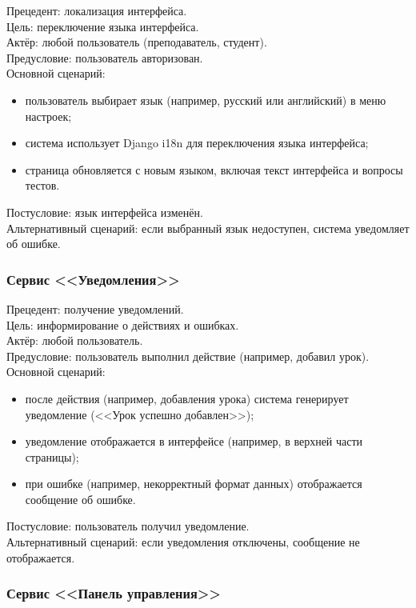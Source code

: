 {Прецедент: локализация интерфейса}. \\
{Цель}: переключение языка интерфейса. \\
{Актёр}: любой пользователь (преподаватель, студент). \\
{Предусловие}: пользователь авторизован. \\
{Основной сценарий}:
\begin{itemize}
	\item пользователь выбирает язык (например, русский или английский) в меню настроек;
	\item система использует Django i18n для переключения языка интерфейса;
	\item страница обновляется с новым языком, включая текст интерфейса и вопросы тестов.
\end{itemize}
{Постусловие}: язык интерфейса изменён. \\
{Альтернативный сценарий}: если выбранный язык недоступен, система уведомляет об ошибке.

\subsubsection{Сервис <<Уведомления>>}

{Прецедент: получение уведомлений}. \\
{Цель}: информирование о действиях и ошибках. \\
{Актёр}: любой пользователь. \\
{Предусловие}: пользователь выполнил действие (например, добавил урок). \\
{Основной сценарий}:
\begin{itemize}
	\item после действия (например, добавления урока) система генерирует уведомление (<<Урок успешно добавлен>>);
	\item уведомление отображается в интерфейсе (например, в верхней части страницы);
	\item при ошибке (например, некорректный формат данных) отображается сообщение об ошибке.
\end{itemize}
{Постусловие}: пользователь получил уведомление. \\
{Альтернативный сценарий}: если уведомления отключены, сообщение не отображается.

\subsubsection{Сервис <<Панель управления>>}

